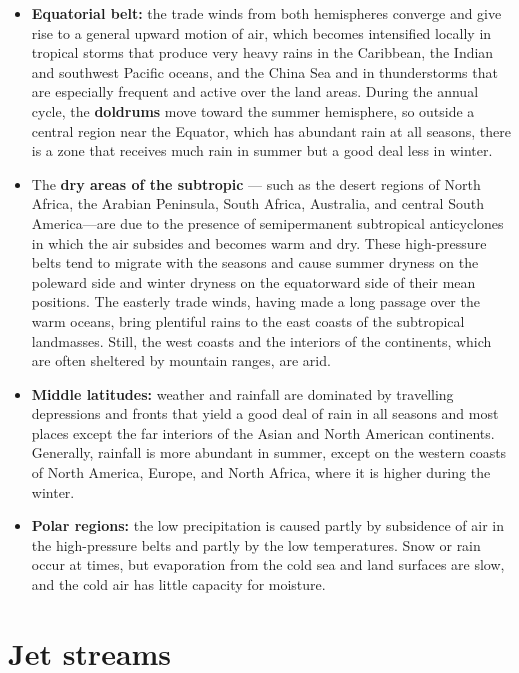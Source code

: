 \documentclass[12pt,oneside]{book}
\providecommand{\tightlist}{%
  \setlength{\itemsep}{0pt}\setlength{\parskip}{0pt}}
\begin{document}
\begin{itemize}
\tightlist
\item
  \textbf{Equatorial belt:} the trade winds from both hemispheres
  converge and give rise to a general upward motion of air, which
  becomes intensified locally in tropical storms that produce very heavy
  rains in the Caribbean, the Indian and southwest Pacific oceans, and
  the China Sea and in thunderstorms that are especially frequent and
  active over the land areas. During the annual cycle, the
  \textbf{doldrums} move toward the summer hemisphere, so outside a
  central region near the Equator, which has abundant rain at all
  seasons, there is a zone that receives much rain in summer but a good
  deal less in winter.
\item
  The \textbf{dry areas of the subtropic} --- such as the desert regions
  of North Africa, the Arabian Peninsula, South Africa, Australia, and
  central South America---are due to the presence of semipermanent
  subtropical anticyclones in which the air subsides and becomes warm
  and dry. These high-pressure belts tend to migrate with the seasons
  and cause summer dryness on the poleward side and winter dryness on
  the equatorward side of their mean positions. The easterly trade
  winds, having made a long passage over the warm oceans, bring
  plentiful rains to the east coasts of the subtropical landmasses.
  Still, the west coasts and the interiors of the continents, which are
  often sheltered by mountain ranges, are arid.
\item
  \textbf{Middle latitudes:} weather and rainfall are dominated by
  travelling depressions and fronts that yield a good deal of rain in
  all seasons and most places except the far interiors of the Asian and
  North American continents. Generally, rainfall is more abundant in
  summer, except on the western coasts of North America, Europe, and
  North Africa, where it is higher during the winter.
\item
  \textbf{Polar regions:} the low precipitation is caused partly by
  subsidence of air in the high-pressure belts and partly by the low
  temperatures. Snow or rain occur at times, but evaporation from the
  cold sea and land surfaces are slow, and the cold air has little
  capacity for moisture.
\end{itemize}

\section{Jet streams}\label{jet-streams}
\end{document}
